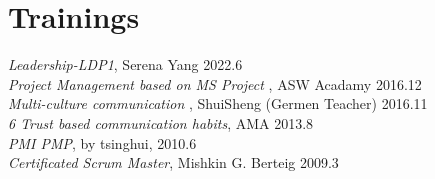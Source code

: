 
\section{Trainings}

{\em Leadership-LDP1}, Serena Yang \hfill 2022.6
\\
{\em Project Management based on MS Project }, ASW Acadamy \hfill 2016.12
\\
{\em Multi-culture communication }, ShuiSheng (Germen Teacher) \hfill 2016.11
\\
{\em 6 Trust based communication habits}, AMA \hfill 2013.8
\\
{\em PMI PMP}, by tsinghui, \hfill 2010.6
\\
{\em Certificated Scrum Master}, Mishkin G. Berteig \hfill 2009.3


